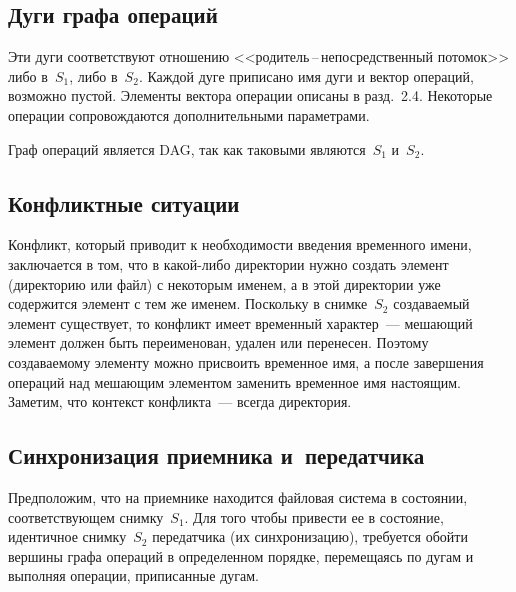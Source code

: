 \begin{multicols}{2}
\vspace*{-3pt}
\subsection{Дуги графа операций}
\vspace*{-1pt}

      Эти дуги соответствуют отношению <<родитель\,--\,непосредственный 
потомок>> либо в~$S_1$, либо в~$S_2$. Каждой дуге приписано имя дуги и 
вектор операций, возможно пустой. Элементы вектора операции описаны в 
разд.~2.4. Некоторые операции со\-про\-вож\-да\-ют\-ся дополнительными 
параметрами. 
      
      Граф операций является DAG, так как таковыми являются~$S_1$ 
и~$S_2$.

\vspace*{-3pt}
\subsection{Конфликтные ситуации}
\vspace*{-1pt}

      Конфликт, который приводит к необходимости введения временного 
имени, заключается в том, что в какой-либо директории нужно создать элемент 
(директорию или файл) с некоторым именем, а в этой директории уже 
содержится элемент с тем же именем. Поскольку в снимке~$S_2$ создаваемый 
элемент существует, то конфликт имеет временный характер~--- мешающий 
элемент должен быть переименован, удален или перенесен. Поэтому 
создаваемому элементу можно присвоить временное имя, а после завершения 
операций над ме\-ша\-ющим элементом заменить временное имя настоящим. 
Заметим, что контекст конфликта~--- всегда директория.

\vspace*{-2pt}
\subsection{Синхронизация приемника и~передатчика}
\vspace*{-1pt}

      Предположим, что на приемнике находится файловая система в 
состоянии, соответствующем снимку~$S_1$. Для того чтобы привести ее в 
состояние, идентичное снимку~$S_2$ передатчика (их синхронизацию), 
требуется обойти вершины графа операций в определенном порядке, 
перемещаясь по дугам и выполняя операции, приписанные дугам.

\vspace*{-3pt}

\end{multicols}
